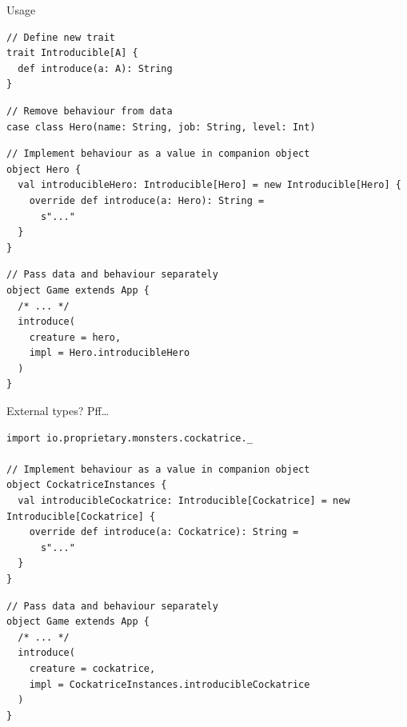 \documentclass[presentation,aspectratio=169,smaller]{beamer}
\begin{document}
\begin{frame}[label={sec:org90fe495},fragile]{Usage}
 \begin{verbatim}
// Define new trait
trait Introducible[A] {
  def introduce(a: A): String
}
\end{verbatim}

\pause

\begin{verbatim}
// Remove behaviour from data
case class Hero(name: String, job: String, level: Int)
\end{verbatim}

\pause

\begin{verbatim}
// Implement behaviour as a value in companion object
object Hero {
  val introducibleHero: Introducible[Hero] = new Introducible[Hero] {
    override def introduce(a: Hero): String =
      s"..."
  }
}
\end{verbatim}

\pause

\begin{verbatim}
// Pass data and behaviour separately
object Game extends App {
  /* ... */
  introduce(
    creature = hero,
    impl = Hero.introducibleHero
  )
}
\end{verbatim}
\end{frame}

\begin{frame}[label={sec:orgc87201a},fragile]{External types? Pff\ldots{}}
 \begin{verbatim}
import io.proprietary.monsters.cockatrice._

// Implement behaviour as a value in companion object
object CockatriceInstances {
  val introducibleCockatrice: Introducible[Cockatrice] = new Introducible[Cockatrice] {
    override def introduce(a: Cockatrice): String =
      s"..."
  }
}
\end{verbatim}

\pause

\begin{verbatim}
// Pass data and behaviour separately
object Game extends App {
  /* ... */
  introduce(
    creature = cockatrice,
    impl = CockatriceInstances.introducibleCockatrice
  )
}
\end{verbatim}
\end{frame}
\end{document}
